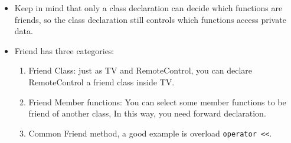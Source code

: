 \documentclass[a4paper,11pt,twoside]{book}
\begin{document}
    \begin{itemize}
        \item Keep in mind that only a class declaration can decide which functions are friends, so the class declaration still controls which functions access private data.
        \item  Friend has three categories:

	\begin{enumerate}
		\item Friend Class: just as TV and RemoteControl, you can declare RemoteControl a friend class inside TV.
		
		\item Friend Member functions: You can select some member functions to be friend of another class, In this way, you need forward declaration.  
		
		\item Common Friend method, a good example is overload \verb=operator <<=. 
	\end{enumerate}

    \end{itemize}
\end{document}
